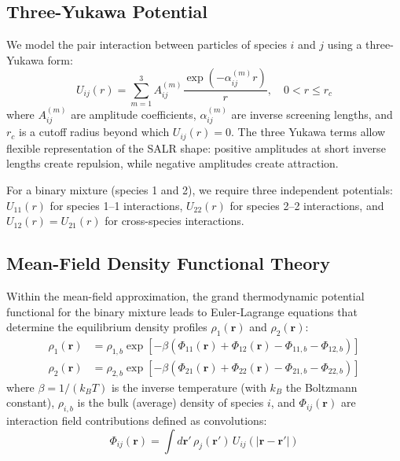 \documentclass[conference]{IEEEtran}
\begin{document}
\subsection{Three-Yukawa Potential}

We model the pair interaction between particles of species $i$ and $j$ using a three-Yukawa form:
\begin{equation}
U_{ij}(r) = \sum_{m=1}^{3} A_{ij}^{(m)} \frac{\exp(-\alpha_{ij}^{(m)} r)}{r}, \quad 0 < r \leq r_c
\label{eq:yukawa}
\end{equation}
where $A_{ij}^{(m)}$ are amplitude coefficients, $\alpha_{ij}^{(m)}$ are inverse screening lengths, and $r_c$ is a cutoff radius beyond which $U_{ij}(r) = 0$. The three Yukawa terms allow flexible representation of the SALR shape: positive amplitudes at short inverse lengths create repulsion, while negative amplitudes create attraction.

For a binary mixture (species 1 and 2), we require three independent potentials: $U_{11}(r)$ for species 1--1 interactions, $U_{22}(r)$ for species 2--2 interactions, and $U_{12}(r) = U_{21}(r)$ for cross-species interactions.

\subsection{Mean-Field Density Functional Theory}

Within the mean-field approximation, the grand thermodynamic potential functional for the binary mixture leads to Euler-Lagrange equations that determine the equilibrium density profiles $\rho_1(\mathbf{r})$ and $\rho_2(\mathbf{r})$:
\begin{align}
\rho_1(\mathbf{r}) &= \rho_{1,b} \exp\!\left[-\beta\left(\Phi_{11}(\mathbf{r}) + \Phi_{12}(\mathbf{r}) - \Phi_{11,b} - \Phi_{12,b}\right)\right] \label{eq:el1} \\
\rho_2(\mathbf{r}) &= \rho_{2,b} \exp\!\left[-\beta\left(\Phi_{21}(\mathbf{r}) + \Phi_{22}(\mathbf{r}) - \Phi_{21,b} - \Phi_{22,b}\right)\right] \label{eq:el2}
\end{align}
where $\beta = 1/(k_B T)$ is the inverse temperature (with $k_B$ the Boltzmann constant), $\rho_{i,b}$ is the bulk (average) density of species $i$, and $\Phi_{ij}(\mathbf{r})$ are interaction field contributions defined as convolutions:
\begin{equation}
\Phi_{ij}(\mathbf{r}) = \int d\mathbf{r}' \, \rho_j(\mathbf{r}') \, U_{ij}(|\mathbf{r} - \mathbf{r}'|)
\label{eq:phi}
\end{equation}
\end{document}
